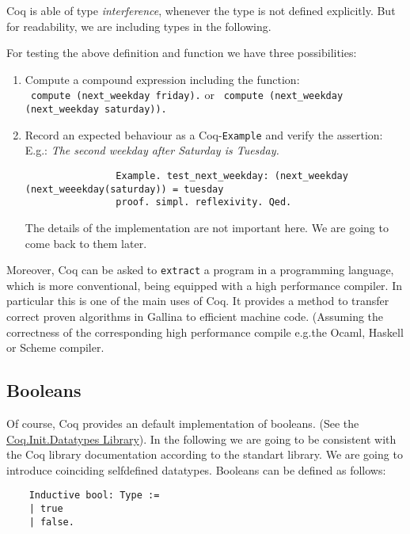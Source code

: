   Coq is able of type {\itshape interference}, whenever the type is not defined explicitly.
  But for readability, we are including types in the following.
   
  For testing the above definition and function we have three possibilities:   
   \begin{enumerate}
   \item Compute a compound expression including the function:\\
   \lstinline! compute (next_weekday friday).! or 
   \lstinline! compute (next_weekday (next_weekday saturday)).!
   \item Record an expected behaviour as a Coq-\lstinline!Example! and verify the assertion: 
         E.g.: {\itshape The second weekday after Saturday is Tuesday.}  
   
		   \begin{lstlisting}
		   		Example. test_next_weekday: (next_weekday (next_weeekday(saturday)) = tuesday 
		   		proof. simpl. reflexivity. Qed.
		   \end{lstlisting}
   			The details of the implementation are not important here. We are going to come back to them later.
   \end{enumerate}   

    Moreover, Coq can be asked to \lstinline!extract! a program in a programming language, which is more conventional, being equipped with a high performance compiler.
    In particular this is one of the main uses of Coq. 
    It provides a method to transfer correct proven algorithms in Gallina to efficient machine code.
    (Assuming the correctness of the corresponding high performance compile e.g.the Ocaml, Haskell or Scheme compiler. 


\subsection{Booleans}

    Of course, Coq provides an default implementation of booleans. (See the \href{https://www.cs.princeton.edu/courses/archive/fall07/cos595/stdlib/html/Coq.Init.Datatypes.html}{Coq.Init.Datatypes Library}). %
    In the following we are going to be consistent with the Coq library documentation according to the standart library. We are going to introduce coinciding selfdefined datatypes.
    Booleans can be defined as follows:
    
    \label{Def:booleans}
    \begin{lstlisting}    
    Inductive bool: Type :=
    | true
    | false.
    \end{lstlisting}
    
